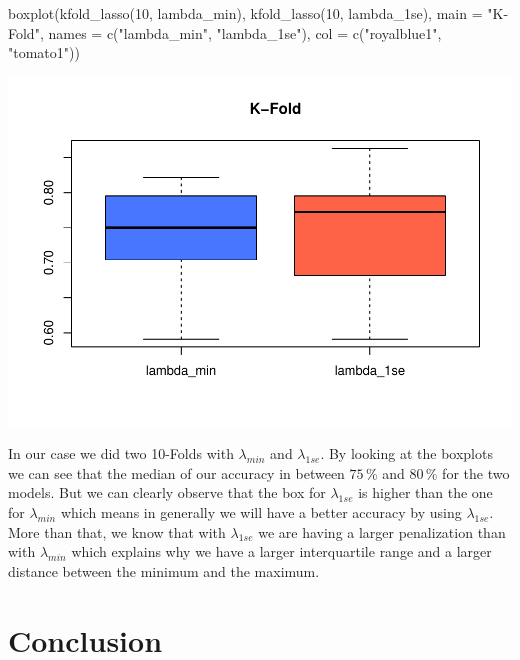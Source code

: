 \documentclass[
]{article}
\newenvironment{Shaded}{\begin{snugshade}}{\end{snugshade}}
\newcommand{\AttributeTok}[1]{\textcolor[rgb]{0.77,0.63,0.00}{#1}}
\newcommand{\DecValTok}[1]{\textcolor[rgb]{0.00,0.00,0.81}{#1}}
\newcommand{\FunctionTok}[1]{\textcolor[rgb]{0.00,0.00,0.00}{#1}}
\newcommand{\NormalTok}[1]{#1}
\newcommand{\StringTok}[1]{\textcolor[rgb]{0.31,0.60,0.02}{#1}}
\begin{document}
\begin{Shaded}
\begin{Highlighting}[]
\FunctionTok{boxplot}\NormalTok{(}\FunctionTok{kfold\_lasso}\NormalTok{(}\DecValTok{10}\NormalTok{, lambda\_min), }\FunctionTok{kfold\_lasso}\NormalTok{(}\DecValTok{10}\NormalTok{, lambda\_1se), }\AttributeTok{main =} \StringTok{"K{-}Fold"}\NormalTok{, }
        \AttributeTok{names =} \FunctionTok{c}\NormalTok{(}\StringTok{"lambda\_min"}\NormalTok{, }\StringTok{"lambda\_1se"}\NormalTok{), }\AttributeTok{col =} \FunctionTok{c}\NormalTok{(}\StringTok{"royalblue1"}\NormalTok{, }\StringTok{"tomato1"}\NormalTok{))}
\end{Highlighting}
\end{Shaded}

\begin{center}\includegraphics{TP3_MERR_HABBOU_KHIDOUR_files/figure-latex/unnamed-chunk-62-1} \end{center}

In our case we did two 10-Folds with \(\lambda_{min}\) and
\(\lambda_{1se}\). By looking at the boxplots we can see that the median
of our accuracy in between \(75\,\%\) and \(80\,\%\) for the two models.
But we can clearly observe that the box for \(\lambda_{1se}\) is higher
than the one for \(\lambda_{min}\) which means in generally we will have
a better accuracy by using \(\lambda_{1se}\). More than that, we know
that with \(\lambda_{1se}\) we are having a larger penalization than
with \(\lambda_{min}\) which explains why we have a larger interquartile
range and a larger distance between the minimum and the maximum.

\hypertarget{conclusion}{%
\section{Conclusion}\label{conclusion}}
\end{document}
